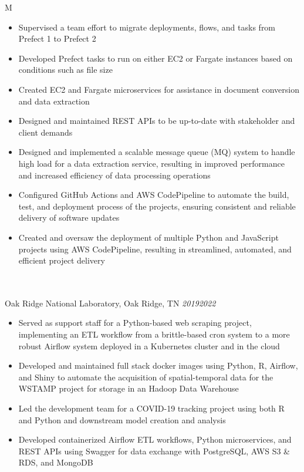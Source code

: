 \documentclass[10pt]{article}%
\begin{document}
\begin{tabularx}{\linewidth}{M}
\begin{itemize}[topsep=-12pt,parsep=0em]
            \item Supervised a team effort to migrate deployments, flows, and tasks from Prefect 1 to Prefect 2 %
            \item Developed Prefect tasks to run on either EC2 or Fargate instances based on conditions such as file size %
            \item Created EC2 and Fargate microservices for assistance in document conversion and data extraction %
            \item Designed and maintained REST APIs to be up-to-date with stakeholder and client demands %
            \item Designed and implemented a scalable message queue (MQ) system to handle high load for a data extraction service, resulting in improved performance and increased efficiency of data processing operations %
            \item Configured GitHub Actions and AWS CodePipeline to automate the build, test, and deployment process of the projects, ensuring consistent and reliable delivery of software updates %
            \item Created and oversaw the deployment of multiple Python and JavaScript projects using AWS CodePipeline, resulting in streamlined, automated, and efficient project delivery %
        \end{itemize} \\
         \\
        Oak Ridge National Laboratory, Oak Ridge, TN \textit{2019\textemdash{}2022} \\
        \begin{itemize}[topsep=-12pt,parsep=0em]
            \setlength\itemsep{0em}
            \item Served as support staff for a Python-based web scraping project, implementing an ETL workflow from a brittle-based cron system to a more robust Airflow system deployed in a Kubernetes cluster and in the cloud %
            \item Developed and maintained full stack docker images using Python, R, Airflow, and Shiny to automate the acquisition of spatial-temporal data for the WSTAMP project for storage in an Hadoop Data Warehouse %
            \item Led the development team for a COVID-19 tracking project using both R and Python and downstream model creation and analysis %
            \item Developed containerized Airflow ETL workflows, Python microservices, and REST APIs using Swagger for data exchange with PostgreSQL, AWS S3 \& RDS, and MongoDB %

\end{itemize}
\end{tabularx}
\end{document}
